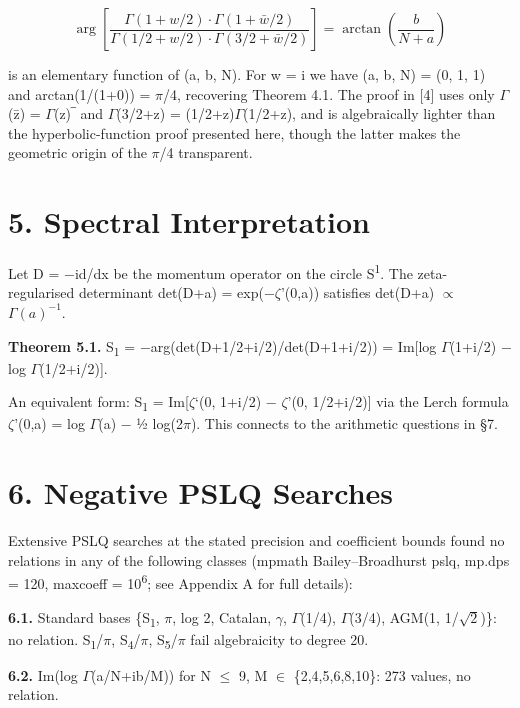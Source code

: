 \documentclass[11pt]{article}
\begin{document}
\[\arg\!\left[\frac{\Gamma(1+w/2)\cdot\Gamma(1+\bar{w}/2)}{\Gamma(1/2+w/2)\cdot\Gamma(3/2+\bar{w}/2)}\right] = \arctan\!\left(\frac{b}{N+a}\right)\]

is an elementary function of (a, b, N). For w = i we have (a, b, N) =
(0, 1, 1) and arctan(1/(1+0)) = \(\pi\)/4, recovering Theorem 4.1. The
proof in {[}4{]} uses only \(\Gamma\)(z̄) = \(\Gamma\)(z)‾ and
\(\Gamma\)(3/2+z) = (1/2+z)\(\Gamma\)(1/2+z), and is algebraically
lighter than the hyperbolic-function proof presented here, though the
latter makes the geometric origin of the \(\pi\)/4 transparent.

\hypertarget{spectral-interpretation}{%
\section{5. Spectral Interpretation}\label{spectral-interpretation}}

Let D = −id/dx be the momentum operator on the circle
S\textsuperscript{1}. The zeta-regularised determinant det(D+a) =
exp(−\(\zeta\)'(0,a)) satisfies det(D+a) \(\propto\) \(\Gamma(a)^{-1}\).

\textbf{Theorem 5.1.} S\textsubscript{1} =
−arg(det(D+1/2+i/2)/det(D+1+i/2)) = Im{[}log \(\Gamma\)(1+i/2) − log
\(\Gamma\)(1/2+i/2){]}.

An equivalent form: S\textsubscript{1} = Im{[}\(\zeta\)`(0, 1+i/2) −
\(\zeta\)'(0, 1/2+i/2){]} via the Lerch formula \(\zeta\)'(0,a) = log
\(\Gamma\)(a) − ½ log(2\(\pi\)). This connects to the arithmetic
questions in §7.

\hypertarget{negative-pslq-searches}{%
\section{6. Negative PSLQ Searches}\label{negative-pslq-searches}}

Extensive PSLQ searches at the stated precision and coefficient bounds
found no relations in any of the following classes (mpmath
Bailey--Broadhurst pslq, mp.dps = 120, maxcoeff = 10\textsuperscript{6};
see Appendix A for full details):

\textbf{6.1.} Standard bases \{S\textsubscript{1}, \(\pi\), log 2,
Catalan, \(\gamma\), \(\Gamma\)(1/4), \(\Gamma\)(3/4), AGM(1,
1/\(\sqrt{2}\))\}: no relation. S\textsubscript{1}/\(\pi\),
S\textsubscript{4}/\(\pi\), S\textsubscript{5}/\(\pi\) fail algebraicity
to degree 20.

\textbf{6.2.} Im(log \(\Gamma\)(a/N+ib/M)) for N \(\leq\) 9, M \(\in\)
\{2,4,5,6,8,10\}: 273 values, no relation.
\end{document}
